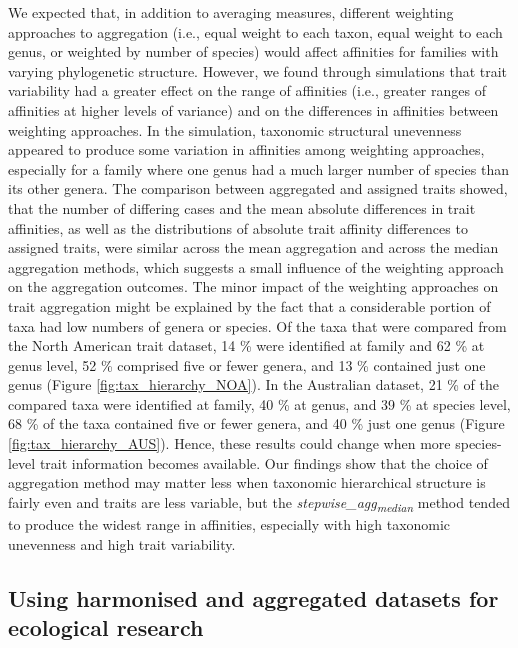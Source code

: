 \documentclass[12pt]{article}
\begin{document}
We expected that, in addition to averaging measures, different weighting approaches to aggregation (i.e., equal weight to each taxon, equal weight to each genus, or weighted by number of species) would affect affinities for families with varying phylogenetic structure. However, we found through simulations that trait variability had a greater effect on the range of affinities (i.e., greater ranges of affinities at higher levels of variance) and on the differences in affinities between weighting approaches. In the simulation, taxonomic structural unevenness appeared to produce some variation in affinities among weighting approaches, especially for a family where one genus had a much larger number of species than its other genera. The comparison between aggregated and assigned traits showed, that the number of differing cases and the mean absolute differences in trait affinities, as well as the distributions of absolute trait affinity differences to assigned traits, were similar across the mean aggregation and across the median aggregation methods, which suggests a small influence of the weighting approach on the aggregation outcomes. The minor impact of the weighting approaches on trait aggregation might be explained by the fact that a considerable portion of taxa had low numbers of genera or species. Of the taxa that were compared from the North American trait dataset, 14 \% were identified at family and 62 \% at genus level, 52 \% comprised five or fewer genera, and 13 \% contained just one genus (Figure \ref{fig:tax_hierarchy_NOA}). In the Australian dataset, 21 \% of the compared taxa were identified at family, 40 \% at genus, and 39 \% at species level, 68 \% of the taxa contained five or fewer genera, and 40 \% just one genus (Figure \ref{fig:tax_hierarchy_AUS}). Hence, these results could change when more species-level trait information becomes available. Our findings show that the choice of aggregation method may matter less when taxonomic hierarchical structure is fairly even and traits are less variable, but the \textit{stepwise\_agg\textsubscript{median}} method tended to produce the widest range in affinities, especially with high taxonomic unevenness and high trait variability. 

\subsection*{Using harmonised and aggregated datasets for ecological research}
\end{document}
